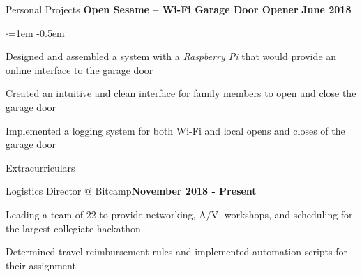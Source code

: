 \documentclass[margin,centered]{resume} %
\begin{document}
\begin{rSection}{Personal Projects}
{\bf Open Sesame – Wi-Fi Garage Door Opener}  \hfill {\bf June 2018}
 \begin{list}{$\cdot$}{\leftmargin=1em} %
   \itemsep -0.5em \vspace{-0.5em} %
	\item 
		Designed and assembled a system with a \textit{Raspberry Pi} that would provide an online interface to the garage door
	\item
		Created an intuitive and clean interface for family members to open and close the garage door
	\item
		Implemented a logging system for both Wi-Fi and local opens and closes of the garage door
  \end{list}

\end{rSection}



\begin{rSection}{Extracurriculars} 

	\begin{rSubsection}{Logistics Director @ Bitcamp}{\textbf{November 2018 - Present}}{}{}
		\item Leading a team of 22 to provide networking, A/V, workshops, and scheduling for the largest collegiate hackathon
		\item Determined travel reimbursement rules and implemented automation scripts for their assignment
	\end{rSubsection}

\end{rSection}
\end{document}
